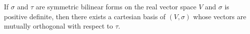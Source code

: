 If $\sigma$ and $\tau$ are symmetric bilinear forms on the real vector space $V$ and $\sigma$ is positive definite, then there exists a cartesian basis of $(V, \sigma)$ whose vectors are mutually orthogonal with respect to $\tau$.
